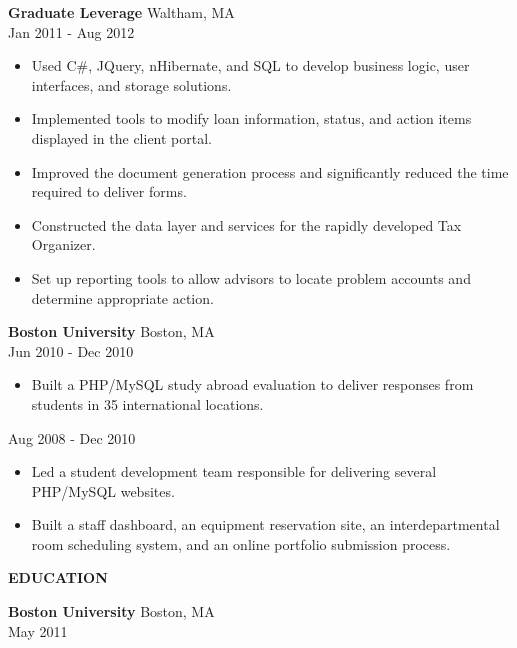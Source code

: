 \documentclass[10pt]{article}
\newcommand{\verticalspace}{\vspace{2.0mm}}
\newcommand{\heading}{\noindent\Large\bf} %
\newcommand{\headingspace}{\vspace{3.5mm}}
\begin{document}
{\bf Graduate Leverage} \hfill Waltham, MA \\
 \hfill Jan 2011 - Aug 2012
\begin{itemize}
\item Used C\#, JQuery, nHibernate, and SQL to develop business logic, user interfaces, and storage solutions.
\item Implemented tools to modify loan information, status, and action items displayed in the client portal.
\item Improved the document generation process and significantly reduced the time required to deliver forms.
\item Constructed the data layer and services for the rapidly developed Tax Organizer.
\item Set up reporting tools to allow advisors to locate problem accounts and determine appropriate action.
\end{itemize}

\verticalspace

{\bf Boston University} \hfill Boston, MA \\
 \hfill Jun 2010 - Dec 2010
\begin{itemize}
\item Built a PHP/MySQL study abroad evaluation to deliver responses from students in 35 international locations.
\end{itemize}

 \hfill Aug 2008 - Dec 2010
\begin{itemize}
\item Led a student development team responsible for delivering several PHP/MySQL websites. 
\item Built a staff dashboard, an equipment reservation site, an interdepartmental room scheduling system, and an online portfolio submission process.
\end{itemize}

\headingspace
{\heading EDUCATION}

\verticalspace

{\bf Boston University} \hfill Boston, MA \\
 \hfill May 2011
\end{document}
